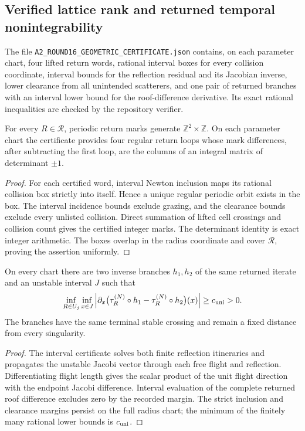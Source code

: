 \subsection{Verified lattice rank and returned temporal nonintegrability}

The file \texttt{A2\_ROUND16\_GEOMETRIC\_CERTIFICATE.json} contains, on each
parameter chart, four lifted return words, rational interval boxes for every
collision coordinate, interval bounds for the reflection residual and its
Jacobian inverse, lower clearance from all unintended scatterers, and one pair
of returned branches with an interval lower bound for the roof-difference
derivative.  Its exact rational inequalities are checked by the repository
verifier.

\begin{lemma}
\label{lem:r16-a2-lattice}
For every \(R\in\mathcal R\), periodic return marks generate
\(\mathbb Z^2\times\mathbb Z\).  On each parameter chart the certificate
provides four regular return loops whose mark differences, after subtracting
the first loop, are the columns of an integral matrix of determinant
\(\pm1\).
\end{lemma}

\begin{proof}
For each certified word, interval Newton inclusion maps its rational collision
box strictly into itself.  Hence a unique regular periodic orbit exists in the
box.  The interval incidence bounds exclude grazing, and the clearance bounds
exclude every unlisted collision.  Direct summation of lifted cell crossings
and collision count gives the certified integer marks.  The determinant
identity is exact integer arithmetic.  The boxes overlap in the radius
coordinate and cover \(\mathcal R\), proving the assertion uniformly.
\end{proof}

\begin{lemma}
\label{lem:r16-a2-uni}
On every chart there are two inverse branches \(h_1,h_2\) of the same returned
iterate and an unstable interval \(J\) such that
\[
 \inf_{R\in U_j}\inf_{x\in J}
 \left|\partial_x\bigl(\tau_R^{(N)}\circ h_1-
                         \tau_R^{(N)}\circ h_2\bigr)(x)\right|
 \ge c_{\rm uni}>0.
\]
The branches have the same terminal stable crossing and remain a fixed
distance from every singularity.
\end{lemma}

\begin{proof}
The interval certificate solves both finite reflection itineraries and
propagates the unstable Jacobi vector through each free flight and reflection.
Differentiating flight length gives the scalar product of the unit flight
direction with the endpoint Jacobi difference.  Interval evaluation of the
complete returned roof difference excludes zero by the recorded margin.  The
strict inclusion and clearance margins persist on the full radius chart; the
minimum of the finitely many rational lower bounds is \(c_{\rm uni}\).
\end{proof}

